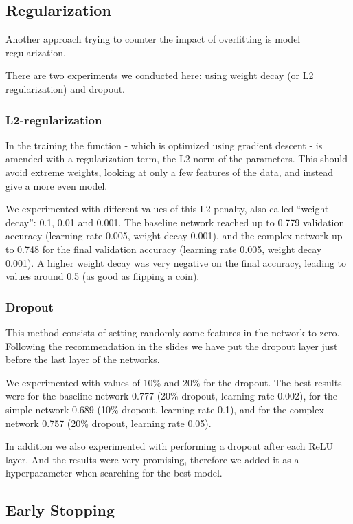 \documentclass[sigconf,nonacm]{acmart}
\begin{document}
\subsection{Regularization}

Another approach trying to counter the impact of overfitting
is model regularization.

There are two experiments we conducted here:
using weight decay (or L2 regularization)
and dropout.

\subsubsection{L2-regularization}
In the training the function - which is optimized 
using gradient descent - is amended
with a regularization term, the L2-norm of the parameters.
This should avoid extreme weights, looking at only
a few features of the data, and instead give a more
even model.

We experimented with different values of this L2-penalty,
also called ``weight decay'': 0.1, 0.01 and 0.001.
The baseline network reached up to 0.779 validation
accuracy (learning rate 0.005, weight decay 0.001),
and the complex network up to 0.748 for the final
validation accuracy (learning rate 0.005, weight
decay 0.001).
A higher weight decay was very negative on the final
accuracy, leading to values around 0.5 (as good
as flipping a coin).

\subsubsection{Dropout}
This method consists
of setting randomly some features in the
network to zero.
Following the recommendation in the slides we have
put the dropout layer just before the last layer
of the networks.

We experimented with values of 10\% and 20\%
for the dropout.
The best results were for the baseline network
0.777 (20\% dropout, learning rate 0.002),
for the simple network 0.689 (10\% dropout, learning rate 0.1),
and for the complex network 0.757 (20\% dropout,
learning rate 0.05).

In addition we also experimented with performing a dropout
after each ReLU layer.
And the results were very promising, therefore we added it as a
hyperparameter when searching for the best model.

\subsection{Early Stopping}
\end{document}
